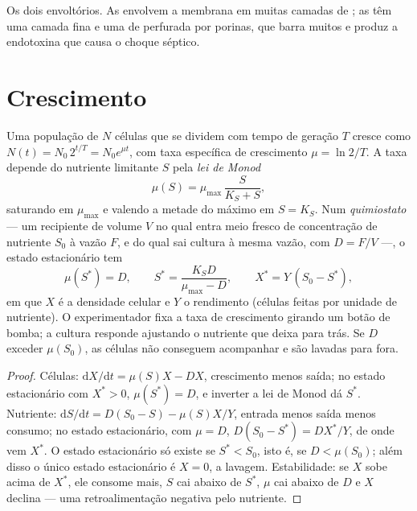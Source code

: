 \begin{omfigure}
{\small Os dois envoltórios. As  envolvem a membrana em
muitas camadas de ; as  têm uma camada fina
e uma  de  perfurada por porinas, que
barra muitos  e produz a endotoxina que causa o choque
séptico.}
\end{omfigure}

\section{Crescimento}

\begin{theorem}\label{thm:b3:bacteriology:monod}
Uma população de $N$ células que se dividem com tempo de geração $T$
cresce como $N(t) = N_{0}\,2^{t/T} = N_{0}e^{\mu t}$, com taxa
específica de crescimento $\mu =
\ln 2/T$. A taxa depende do nutriente
limitante $S$ pela \emph{lei de Monod}
\[
\mu(S) = \mu_{\max}\,\frac{S}{K_{S} + S},
\]
saturando em $\mu_{\max}$ e valendo a metade do máximo em $S = K_{S}$.
Num \emph{quimiostato} --- um recipiente de volume $V$ no qual entra
meio fresco de concentração de nutriente $S_{0}$ à vazão $F$, e do qual
sai cultura à mesma vazão, com  $D = F/V$ ---, o estado
estacionário tem
\[
\mu(S^{*}) = D,\qquad S^{*} = \frac{K_{S}D}{\mu_{\max} - D},\qquad
X^{*} = Y\,(S_{0} - S^{*}),
\]
em que $X$ é a densidade celular e $Y$ o rendimento (células feitas por
unidade de nutriente). O experimentador fixa a taxa de crescimento
girando um botão de bomba; a cultura responde ajustando o nutriente que
deixa para trás. Se $D$ exceder $\mu(S_{0})$, as células não conseguem
acompanhar e são lavadas para fora.
\end{theorem}
\begin{proof}
Células: $\mathrm{d}X/\mathrm{d}t = \mu(S)X - DX$, crescimento menos
saída; no estado estacionário com $X^{*} > 0$, $\mu(S^{*}) = D$, e
inverter a lei de Monod dá $S^{*}$. Nutriente:
$\mathrm{d}S/\mathrm{d}t = D(S_{0} -
S) - \mu(S)X/Y$, entrada menos
saída menos consumo; no estado estacionário, com $\mu = D$,
$D(S_{0} - S^{*}) = DX^{*}/Y$, de onde vem $X^{*}$. O estado
estacionário só existe se $S^{*} < S_{0}$, isto é, se
$D <
\mu(S_{0})$; além disso o único estado estacionário é $X = 0$, a
lavagem. Estabilidade: se $X$ sobe acima de $X^{*}$, ele consome mais,
$S$ cai abaixo de $S^{*}$, $\mu$ cai abaixo de $D$ e $X$ declina ---
uma retroalimentação negativa pelo nutriente.
\end{proof}

